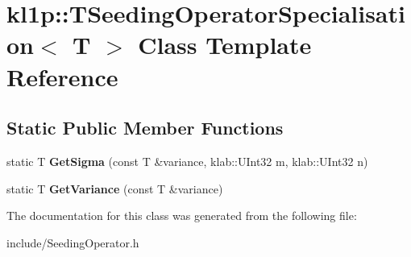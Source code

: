 \hypertarget{classkl1p_1_1TSeedingOperatorSpecialisation}{}\section{kl1p\+:\+:T\+Seeding\+Operator\+Specialisation$<$ T $>$ Class Template Reference}
\label{classkl1p_1_1TSeedingOperatorSpecialisation}
\subsection*{Static Public Member Functions}
\begin{DoxyCompactItemize}
\item 
static T {\bfseries Get\+Sigma} (const T \&variance, klab\+::\+U\+Int32 m, klab\+::\+U\+Int32 n)\hypertarget{classkl1p_1_1TSeedingOperatorSpecialisation_a211975071171a88832099140d0889f14}{}\label{classkl1p_1_1TSeedingOperatorSpecialisation_a211975071171a88832099140d0889f14}

\item 
static T {\bfseries Get\+Variance} (const T \&variance)\hypertarget{classkl1p_1_1TSeedingOperatorSpecialisation_a567f2bd2e81498fc8126513a4f89e572}{}\label{classkl1p_1_1TSeedingOperatorSpecialisation_a567f2bd2e81498fc8126513a4f89e572}

\end{DoxyCompactItemize}


The documentation for this class was generated from the following file\+:\begin{DoxyCompactItemize}
\item 
include/Seeding\+Operator.\+h\end{DoxyCompactItemize}
